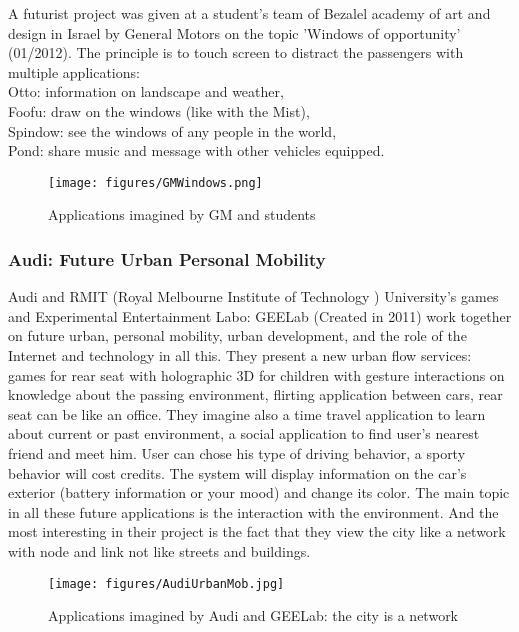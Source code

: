\documentclass[a4paper]{article}
\begin{document}
A futurist project \cite{GMWindows} was given at a student's team of Bezalel academy of art and design in Israel by General Motors on the topic 'Windows of opportunity' (01/2012). The principle is to touch screen to distract the passengers with multiple applications: \\
Otto: information on landscape and weather,\\
Foofu: draw on the windows (like with the Mist),\\
Spindow: see the windows of any people in the world,\\
Pond: share music and message with other vehicles equipped.
\begin{figure}
\begin{center}
\texttt{[image: figures/GMWindows.png]}
\caption{Applications imagined by GM and students}
\end{center}
\end{figure}

\subsubsection{Audi: Future Urban Personal Mobility}

Audi and RMIT \cite{AudiUrbanMob} (Royal Melbourne Institute of Technology ) University's games and Experimental Entertainment Labo: GEELab (Created in 2011) work together on future urban, personal mobility, urban development, and the role of the Internet and technology in all this. They present a new urban flow services: games for rear seat with holographic 3D for children with gesture interactions on knowledge about the passing environment, flirting application between cars, rear seat can be like an office. They imagine also a time travel application to learn about current or past environment, a social application to find user's nearest friend and meet him. User can chose his type of driving behavior, a sporty behavior will cost credits. The system will display information on the car's exterior (battery information or your mood) and change its color. The main topic in all these future applications is the interaction with the environment. And the most interesting in their project is the fact that they view the city like a network with node and link not like streets and buildings.
\begin{figure}
\begin{center}
\texttt{[image: figures/AudiUrbanMob.jpg]}
\caption{Applications imagined by Audi and GEELab: the city is a network}
\end{center}
\end{figure}
\end{document}
